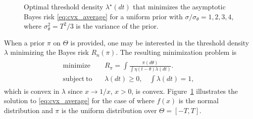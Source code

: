 \begin{figure}
\begin{center}
%
\caption{\label{fig:opt_density}
Optimal threshold density $\lambda^\star(dt)$ that minimizes the asymptotic Bayes risk \eqref{eq:cvx_average} for a uniform prior with $\sigma/\sigma_\theta=1,2,3,4$, where $\sigma_\theta^2=T^2/3$ is the variance of the prior. 
}
\end{center}
\end{figure}

When a prior $\pi$ on $\Theta$ is provided, one may be interested in the threshold density $\lambda$ minimizing the Bayes risk $R_n(\pi)$. The resulting minimization problem is 
\begin{align}
\label{eq:cvx_average}
\begin{split}
\mathrm{minimize} \quad & R_{\pi} =  \int \frac{\pi(d\theta)}{ \int \eta \left( t-\theta\right) \lambda(dt)}. \\ 
\mathrm{subject~to} \quad & \lambda(dt)\geq 0,\quad \int \lambda(dt) =1, 
\end{split}
\end{align}
which is convex in $\lambda$ since $x \rightarrow 1/x$, $x>0$, is convex. Figure~\ref{fig:opt_density}  illustrates the solution to \eqref{eq:cvx_average} for the case of where $f(x)$ is the normal distribution and $\pi$ is the uniform distribution over $\Theta = [-T,T]$. %
\fi

